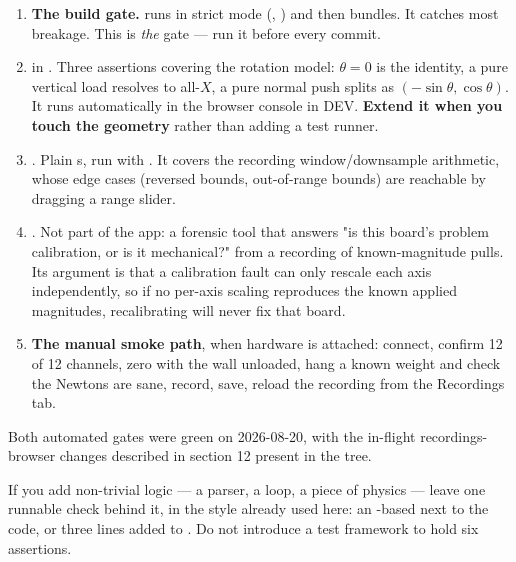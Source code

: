 \documentclass[11pt,a4paper]{article}
\begin{document}
\begin{enumerate}
  \item \textbf{The build gate.}  runs  in strict
        mode (, ) and then
        bundles. It catches most breakage. This is \emph{the} gate --- run it
        before every commit.
  \item \textbf{} in . Three
        assertions covering the rotation model: $\theta = 0$ is the identity, a
        pure vertical load resolves to all-$X$, a pure normal push splits as
        $(-\sin\theta, \cos\theta)$. It runs automatically in the browser console
        in DEV. \textbf{Extend it when you touch the geometry} rather than
        adding a test runner.
  \item \textbf{}. Plain s, run
        with . It covers the recording
        window/downsample arithmetic, whose edge cases (reversed bounds,
        out-of-range bounds) are reachable by dragging a range slider.
  \item \textbf{}. Not part of the app: a
        forensic tool that answers "is this board's problem calibration, or is it
        mechanical?" from a recording of known-magnitude pulls. Its argument is
        that a calibration fault can only rescale each axis independently, so if
        no per-axis scaling reproduces the known applied magnitudes,
        recalibrating will never fix that board.
  \item \textbf{The manual smoke path}, when hardware is attached: connect,
        confirm 12 of 12 channels, zero with the wall unloaded, hang a known
        weight and check the Newtons are sane, record, save, reload the
        recording from the Recordings tab.
\end{enumerate}

Both automated gates were green on 2026-08-20, with the in-flight
recordings-browser changes described in section 12 present in the tree.

\begin{infobox}
If you add non-trivial logic --- a parser, a loop, a piece of physics --- leave
one runnable check behind it, in the style already used here: an
-based  next to the code, or three lines added to
. Do not introduce a test framework to hold six
assertions.
\end{infobox}
\end{document}
